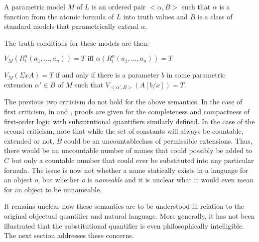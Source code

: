 A parametric model $M$ of $L$ is an ordered pair
$<\alpha, B>$ such that $\alpha$ is a function from the atomic formula
of $L$ into truth values and $B$ is a class of standard models that
parametrically extend $\alpha$.  

The truth conditions for these models are then:
\begin{te}
$V_M(R^n_i(a_1,...,a_n)) = T \text{ iff } \alpha(R^n_i(a_1,...,a_n)) = T$
\end{te}
\begin{te}
  $V_M(\Sigma xA) = T$ if and only if there is a parameter $b$ in some
  parametric extension $\alpha' \in B$ of $M$ such that
  $V_{<\alpha', B>}(A[b/x]) = T$.\\
  \label{ext}
\end{te} 

The previous two criticism do not hold for the above semantics.  
In the case of first criticism, in \cite{bonevac84} and \cite{dunn}, proofs are given for the 
completeness and compactness of first-order logic with substitutional 
quantifiers similarly defined.
In the case of the second criticism, note that while the set of
constants will always be countable, extended or not, $B$ could be an
uncountableclass of permissible extensions. Thus, there would be an
uncountable number of names that could possibly be added to $C$ but
only a countable number that could ever be substituted into any
particular formula.  The issue is now not whether a name statically
exists in a language for an object $o$, but whether $o$ is
\emph{nameable} and it is unclear what it would even mean for an
object to be unnameable.

It remains unclear how these semantics are to be understood
in relation to the original objectual quantifier and natural language.
More generally, it has not been illustrated that the substitutional
quantifier is even philosophically intelligible.  The next section
addresses these concerns.

